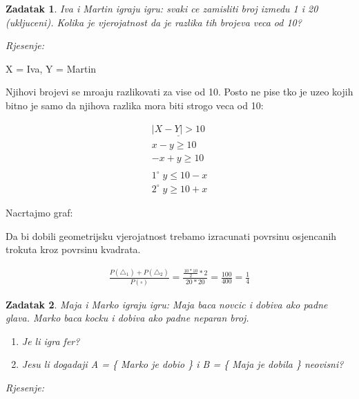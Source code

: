 \documentclass{report}
\newcommand{\rjesenje}{\begin{flushleft}\it Rjesenje:\end{flushleft}}
\theoremstyle{plain}
\newtheorem{thm}{Zadatak}[chapter] %
\begin{document}
\newpage

\begin{thm}Iva i Martin igraju igru: svaki ce zamisliti broj izmedu 1 i 20 (ukljuceni). 
    Kolika je vjerojatnost da je razlika tih brojeva veca od 10?
\end{thm} 
\rjesenje

X = Iva, Y = Martin

Njihovi brojevi se mroaju razlikovati za vise od 10. Posto ne pise tko je uzeo kojih
bitno je samo da njihova razlika mora biti strogo veca od 10: \vspace{0.5pc}

\begin{align*}
    \underline{|X-Y| > 10} \\
    x - y \geq 10 \\
    -x + y \geq 10 \\
    \\
    1^{\circ}\; y \leq 10 - x\\
    2^{\circ}\; y \geq 10 + x
\end{align*}

Nacrtajmo graf: \vspace{0.5pc}


Da bi dobili geometrijsku vjerojatnost trebamo izracunati povrsinu osjencanih 
trokuta kroz povrsinu kvadrata.

\begin{align*}
    \frac{P(\triangle_1)+P(\triangle_2)}{P(\square)} = \frac{\frac{10*10}{2}*2}{20*20} = \frac{100}{400} = \frac{1}{4}
\end{align*}


\newpage

\begin{thm}Maja i Marko igraju igru: Maja baca novcic i dobiva ako padne glava. 
    Marko baca kocku i dobiva ako padne neparan broj.
    \begin{enumerate}[label=(\alph*)]
        \item Je li igra fer?
        \item Jesu li dogadaji A = \{ Marko je dobio \} i B = \{ Maja je dobila \} neovisni?
    \end{enumerate}
\end{thm} 
\rjesenje
\end{document}
